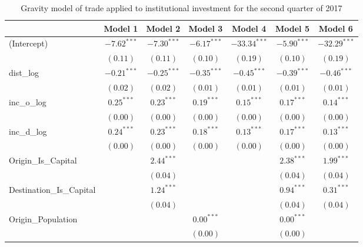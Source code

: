 \begin{table}
	\begin{center}
		\small
		\caption[CGravity Model of Trade for Q2 2017]{Gravity model of trade applied to institutional investment for the second quarter of 2017}
		\begin{tabular}{l c c c c c c }
			\hline
			& Model 1 & Model 2 & Model 3 & Model 4 & Model 5 & Model 6 \\
			\hline
			(Intercept)                  & $-7.62^{***}$ & $-7.30^{***}$ & $-6.17^{***}$ & $-33.34^{***}$ & $-5.90^{***}$ & $-32.29^{***}$ \\
			& $(0.11)$      & $(0.11)$      & $(0.10)$      & $(0.19)$       & $(0.10)$      & $(0.19)$       \\
			dist\_log                    & $-0.21^{***}$ & $-0.25^{***}$ & $-0.35^{***}$ & $-0.45^{***}$  & $-0.39^{***}$ & $-0.46^{***}$  \\
			& $(0.02)$      & $(0.02)$      & $(0.01)$      & $(0.01)$       & $(0.01)$      & $(0.01)$       \\
			inc\_o\_log                  & $0.25^{***}$  & $0.23^{***}$  & $0.19^{***}$  & $0.15^{***}$   & $0.17^{***}$  & $0.14^{***}$   \\
			& $(0.00)$      & $(0.00)$      & $(0.00)$      & $(0.00)$       & $(0.00)$      & $(0.00)$       \\
			inc\_d\_log                  & $0.24^{***}$  & $0.23^{***}$  & $0.18^{***}$  & $0.13^{***}$   & $0.17^{***}$  & $0.13^{***}$   \\
			& $(0.00)$      & $(0.00)$      & $(0.00)$      & $(0.00)$       & $(0.00)$      & $(0.00)$       \\
			Origin\_Is\_Capital          &               & $2.44^{***}$  &               &                & $2.38^{***}$  & $1.99^{***}$   \\
			&               & $(0.04)$      &               &                & $(0.04)$      & $(0.04)$       \\
			Destination\_Is\_Capital     &               & $1.24^{***}$  &               &                & $0.94^{***}$  & $0.31^{***}$   \\
			&               & $(0.04)$      &               &                & $(0.04)$      & $(0.04)$       \\
			Origin\_Population           &               &               & $0.00^{***}$  &                & $0.00^{***}$  &                \\
			&               &               & $(0.00)$      &                & $(0.00)$      &                \\

\end{tabular}
\end{center}
\end{table}
